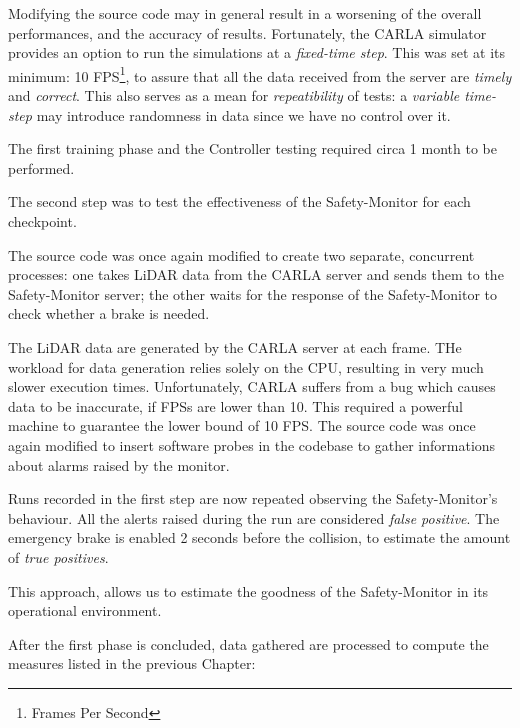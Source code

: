 Modifying the source code may in general result in a worsening of the overall performances, and the accuracy of results. Fortunately, the CARLA simulator provides an option to run the simulations at a \textsl{fixed-time step}. This was set at its minimum: 10 FPS\footnote{Frames Per Second}, to assure that all the data received from the server are \textsl{timely} and \textsl{correct}. This also serves as a mean for \textsl{repeatibility} of tests: a \textsl{variable time-step} may introduce randomness in data since we have no control over it.

The first training phase and the Controller testing required circa 1 month to be performed.\newline

The second step was to test the effectiveness of the Safety-Monitor for each checkpoint.

The source code was once again modified to create two separate, concurrent processes: one takes LiDAR data from the CARLA server and sends them to the Safety-Monitor server; the other waits for the response of the Safety-Monitor to check whether a brake is needed.

The LiDAR data are generated by the CARLA server at each frame. THe workload for data generation relies solely on the CPU, resulting in very much slower execution times. Unfortunately, CARLA suffers from a bug which causes data to be inaccurate, if FPSs are lower than 10. This required a powerful machine to guarantee the lower bound of 10 FPS.
The source code was once again modified to insert software probes in the codebase to gather informations about alarms raised by the monitor.

Runs recorded in the first step are now repeated observing the Safety-Monitor's behaviour. All the alerts raised during the run are considered \textsl{false positive}. The emergency brake is enabled 2 seconds before the collision, to estimate the amount of \textsl{true positives}.

This approach, allows us to estimate the goodness of the Safety-Monitor in its operational environment.\newline

After the first phase is concluded, data gathered are processed to compute the measures listed in the previous Chapter:

